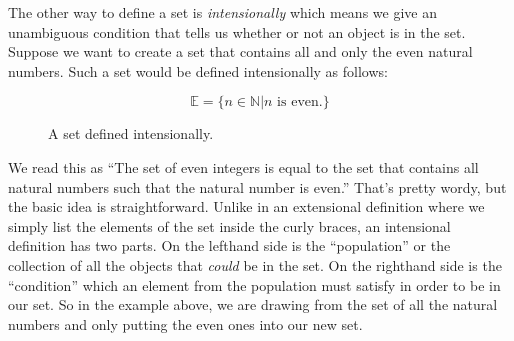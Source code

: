 The other way to define a set is \emph{intensionally} which means we give an unambiguous condition that tells us whether or not an object is in the set. Suppose we want to create a set that contains all and only the even natural numbers. Such a set would be defined intensionally as follows:
\begin{figure}
\[\mathbb{E}=\{n \in \mathbb{N} | n \text{ is even.}\}\]
	\caption{A set defined intensionally.}
	\label{fig:setintension}
\end{figure}
We read this as ``The set of even integers is equal to the set that contains all natural numbers such that the natural number is even.'' That's pretty wordy, but the basic idea is straightforward. Unlike in an extensional definition where we simply list the elements of the set inside the curly braces, an intensional definition has two parts. On the lefthand side is the ``population'' or the collection of all the objects that \emph{could} be in the set. On the righthand side is the ``condition'' which an element from the population must satisfy in order to be in our set. So in the example above, we are drawing from the set of all the natural numbers and only putting the even ones into our new set.
